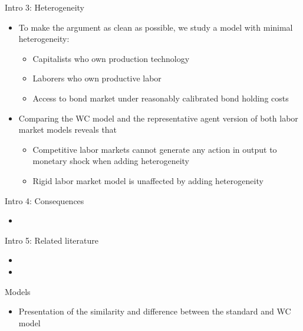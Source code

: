 \documentclass{beamer}
\newcommand{\bit}{\begin{itemize}}
\newcommand{\eit}{\end{itemize}}
\begin{document}
\begin{frame}{Intro 3: Heterogeneity}

\bit
	\item To make the argument as clean as possible, we study a model with minimal heterogeneity: 
		\bit
			\item Capitalists who own production technology
			\item Laborers who own productive labor
			\item Access to bond market under reasonably calibrated bond holding costs
		\eit
	\item Comparing the WC model and the representative agent version of both labor market models reveals that
		\bit
			\item Competitive labor markets cannot generate any action in output to monetary shock when adding heterogeneity
			\item Rigid labor market model is unaffected by adding heterogeneity
		\eit
\eit


\end{frame}

\begin{frame}{Intro 4: Consequences}

\bit
	\item 
\eit


\end{frame}

\begin{frame}{Intro 5: Related literature}

\bit
	\item 
	\item 
\eit


\end{frame}

\begin{frame}{Models}

\bit
	\item Presentation of the similarity and difference between the standard and WC model
\eit


\end{frame}
\end{document}
